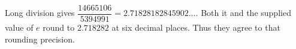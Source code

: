 Long division gives $\dfrac{14665106}{5394991}=2.71828182845902\ldots$. Both it and the supplied value of $e$ round to $\boxed{2.718282}$ at six decimal places. Thus they agree to that rounding precision.
